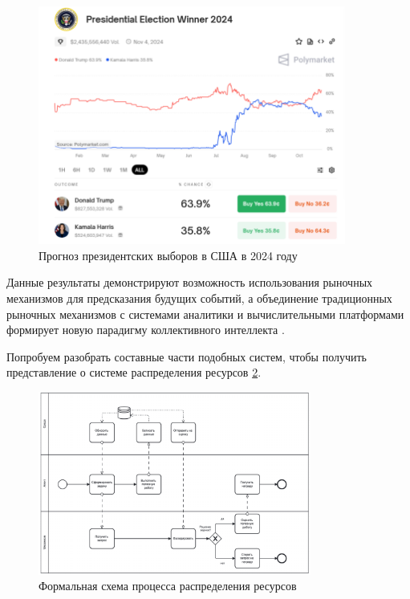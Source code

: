 \documentclass[
    14pt,
    specialist,
    candidate, %
    subf, %
    href,
    dotsinheaders=false
]{disser}
\begin{document}
\begin{figure}[h]
  \centering
  \includegraphics[width=0.9\textwidth]{./assets/polymarket-elections.png}
  \caption{Прогноз президентских выборов в США в 2024 году}
  \label{fig:polymarket-elections}
\end{figure}

Данные результаты демонстрируют возможность использования рыночных механизмов для предсказания будущих событий, а объединение традиционных рыночных механизмов с системами аналитики и вычислительными платформами формирует новую парадигму коллективного интеллекта \cite{berg2020prediction}.

Попробуем разобрать составные части подобных систем, чтобы получить представление о системе распределения ресурсов \ref{fig:bpmn-new}.

\begin{figure}[h]
  \centering
  \includegraphics[width=0.8\textwidth]{./assets/bpmn-new.png}
  \caption{Формальная схема процесса распределения ресурсов}
  \label{fig:bpmn-new}
\end{figure}
\end{document}
